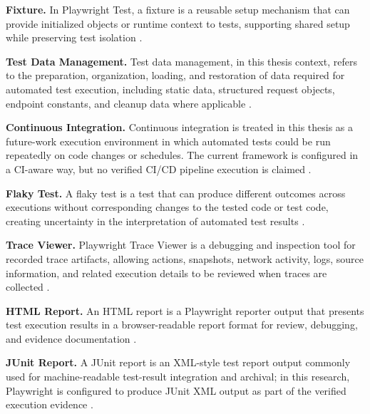 \begin{sloppypar}
\noindent\textbf{Fixture.} In Playwright Test, a fixture is a reusable setup mechanism that can provide initialized objects or runtime context to tests, supporting shared setup while preserving test isolation \autocite{playwright_docs_fixtures_2026}.

\noindent\textbf{Test Data Management.} Test data management, in this thesis context, refers to the preparation, organization, loading, and restoration of data required for automated test execution, including static data, structured request objects, endpoint constants, and cleanup data where applicable \autocite{istqb_glossary_test_data_preparation_2026,istqb_glossary_data_driven_testing_2026}.

\noindent\textbf{Continuous Integration.} Continuous integration is treated in this thesis as a future-work execution environment in which automated tests could be run repeatedly on code changes or schedules. The current framework is configured in a CI-aware way, but no verified CI/CD pipeline execution is claimed \autocite{playwright_docs_configuration_2026,playwright_docs_parallelism_2026}.

\noindent\textbf{Flaky Test.} A flaky test is a test that can produce different outcomes across executions without corresponding changes to the tested code or test code, creating uncertainty in the interpretation of automated test results \autocite{habchi_flaky_tests_2022,tahir_flakiness_review_2023}.

\noindent\textbf{Trace Viewer.} Playwright Trace Viewer is a debugging and inspection tool for recorded trace artifacts, allowing actions, snapshots, network activity, logs, source information, and related execution details to be reviewed when traces are collected \autocite{playwright_docs_trace_viewer_2026}.

\noindent\textbf{HTML Report.} An HTML report is a Playwright reporter output that presents test execution results in a browser-readable report format for review, debugging, and evidence documentation \autocite{playwright_docs_reporters_2026}.

\noindent\textbf{JUnit Report.} A JUnit report is an XML-style test report output commonly used for machine-readable test-result integration and archival; in this research, Playwright is configured to produce JUnit XML output as part of the verified execution evidence \autocite{playwright_docs_reporters_2026}.
\end{sloppypar}

